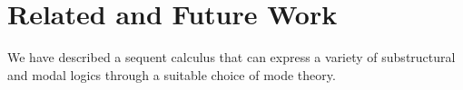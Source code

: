 \section{Related and Future Work}

We have described a sequent calculus that can express a variety of
substructural and modal logics through a suitable choice of mode theory.



